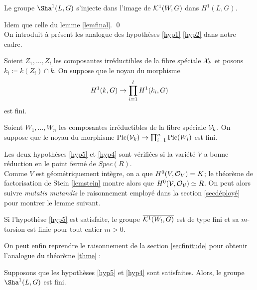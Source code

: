 \documentclass[11pt]{article}
\begin{document}
\begin{lemme}
    Le groupe $\Sha^1(L,G)$ s'injecte dans l'image de $\mathcal{K}^1(W,G)$ dans $H^1(L,G)$.
\end{lemme}

\proof Idem que celle du lemme \ref{lemfinal}. \qed \\

On introduit à présent les analogue des hypothèses \ref{hyp1} \ref{hyp2} dans notre cadre. 

\begin{hypoe}\label{hyp5}
Soient $Z_1,...,Z_l$ les composantes irréductibles de la fibre spéciale $\mathcal{X}_k$ et posons $k_i \coloneqq k(Z_i) \cap \overline{k}$. On suppose que le noyau du morphisme
$$
H^1(k, G) \rightarrow \prod_{i=1}^l H^1(k_i, G)
$$
est fini.
\end{hypoe}

\begin{hypoe}\label{hyp4}
Soient $W_1,...,W_n$ les composantes irréductibles de la fibre spéciale $\mathcal{V}_k$. On suppose que le noyau du morphisme $\operatorname{Pic}(\mathcal{V}_k) \rightarrow \prod_{i=1}^n\operatorname{Pic}(W_i)$ est fini.
\end{hypoe}

\rmke Les deux hypothèses \ref{hyp5} et
\ref{hyp4} sont vérifiées si la variété $V$ a bonne réduction en le point fermé de $Spec(R)$.\\

Comme $V$ est géométriquement intègre, on a que $H^0(V,\mathcal{O}_V) = K$; le théorème de factorisation de Stein \ref{lemstein} montre alors que $H^0(\mathcal{V},\mathcal{O}_{\mathcal{V}}) \simeq R$. On peut alors suivre \textit{mutatis mutandis} le raisonnement employé dans la section \ref{secdéployé} pour montrer le lemme suivant.

\begin{lemme}
 Si l'hypothèse \ref{hyp5} est satisfaite, le groupe $\overline{\mathcal{K}^1(W_l,G)}$ est de type fini et sa $m$-torsion est finie pour tout entier $m > 0$.
\end{lemme}

On peut enfin reprendre le raisonnement de la section \ref{secfinitude} pour obtenir l'analogue du théorème \ref{thme} :

\begin{thme}
Supposons que les hypothèses \ref{hyp5} et \ref{hyp4} sont satisfaites. Alors, le groupe $\Sha^1(L,G)$ est fini.
\end{thme}




\end{document}
